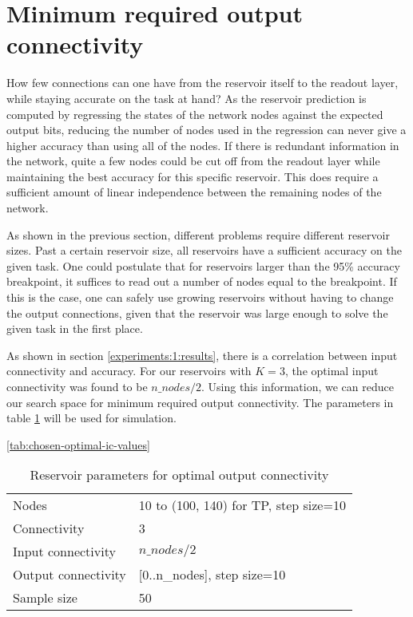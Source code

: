 \section{Minimum required output connectivity}

How few connections can one have from the reservoir itself to the readout layer,
while staying accurate on the task at hand?
As the reservoir prediction is computed by regressing the states of the network nodes against the expected output bits,
reducing the number of nodes used in the regression can never give a higher accuracy than using all of the nodes.
If there is redundant information in the network, quite a few nodes could be cut off from the readout layer while maintaining the best accuracy for this specific reservoir.
This does require a sufficient amount of linear independence between the remaining nodes of the network.

As shown in the previous section, different problems require different reservoir sizes.
Past a certain reservoir size, all reservoirs have a sufficient accuracy on the given task.
One could postulate that for reservoirs larger than the 95\% accuracy breakpoint,
it suffices to read out a number of nodes equal to the breakpoint.
If this is the case, one can safely use growing reservoirs without having to change the output connections,
given that the reservoir was large enough to solve the given task in the first place.

As shown in section \ref{experiments:1:results}, there is a correlation between input connectivity and accuracy.
For our reservoirs with $K=3$, the optimal input connectivity was found to be $n\_nodes/2$.
Using this information, we can reduce our search space for minimum required output connectivity.
The parameters in table \ref{tab:oc-reservoir-parameters} will be used for simulation.

\ref{tab:chosen-optimal-ic-values}

\begin{table}[ht]
    \centering
    \caption{Reservoir parameters for optimal output connectivity}
    \label{tab:oc-reservoir-parameters}
    \begin{tabular}{ll}
        Nodes               & 10 to (100, 140) for TP, step size=10 \\
        Connectivity        & 3                              \\
        Input connectivity  & $ n\_nodes / 2 $               \\
        Output connectivity & [0..n\_nodes], step size=10    \\
        Sample size         & 50
    \end{tabular}
\end{table}


